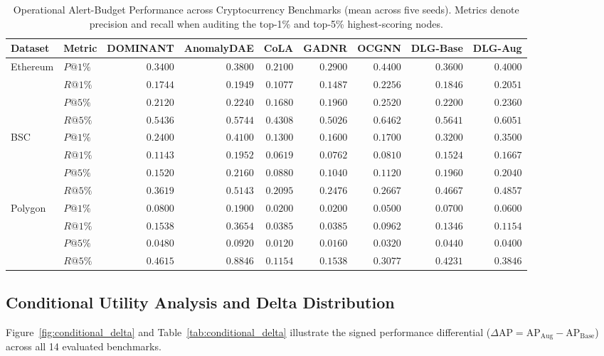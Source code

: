 \documentclass[applsci,article,submit,moreauthors,pdftex]{Definitions/mdpi}
\begin{document}
\begin{table}[htbp]
\centering\small\setlength{\tabcolsep}{3.5pt}
\caption{Operational Alert-Budget Performance across Cryptocurrency Benchmarks (mean across five seeds). Metrics denote precision and recall when auditing the top-1\% and top-5\% highest-scoring nodes.}
\label{tab:alert_budget}
\begin{tabularx}{\textwidth}{llrrrrrrr}\toprule
\textbf{Dataset} & \textbf{Metric} & \textbf{DOMINANT} & \textbf{AnomalyDAE} & \textbf{CoLA} & \textbf{GADNR} & \textbf{OCGNN} & \textbf{DLG-Base} & \textbf{DLG-Aug} \\\midrule
\multirow{4}{*}{Ethereum} 
& $P@1\%$ & $0.3400$ & $0.3800$ & $0.2100$ & $0.2900$ & $\mathbf{0.4400}$ & $0.3600$ & $0.4000$ \\
& $R@1\%$ & $0.1744$ & $0.1949$ & $0.1077$ & $0.1487$ & $\mathbf{0.2256}$ & $0.1846$ & $0.2051$ \\
& $P@5\%$ & $0.2120$ & $0.2240$ & $0.1680$ & $0.1960$ & $\mathbf{0.2520}$ & $0.2200$ & $0.2360$ \\
& $R@5\%$ & $0.5436$ & $0.5744$ & $0.4308$ & $0.5026$ & $\mathbf{0.6462}$ & $0.5641$ & $0.6051$ \\\midrule
\multirow{4}{*}{BSC} 
& $P@1\%$ & $0.2400$ & $\mathbf{0.4100}$ & $0.1300$ & $0.1600$ & $0.1700$ & $0.3200$ & $0.3500$ \\
& $R@1\%$ & $0.1143$ & $\mathbf{0.1952}$ & $0.0619$ & $0.0762$ & $0.0810$ & $0.1524$ & $0.1667$ \\
& $P@5\%$ & $0.1520$ & $\mathbf{0.2160}$ & $0.0880$ & $0.1040$ & $0.1120$ & $0.1960$ & $0.2040$ \\
& $R@5\%$ & $0.3619$ & $\mathbf{0.5143}$ & $0.2095$ & $0.2476$ & $0.2667$ & $0.4667$ & $0.4857$ \\\midrule
\multirow{4}{*}{Polygon} 
& $P@1\%$ & $0.0800$ & $\mathbf{0.1900}$ & $0.0200$ & $0.0200$ & $0.0500$ & $0.0700$ & $0.0600$ \\
& $R@1\%$ & $0.1538$ & $\mathbf{0.3654}$ & $0.0385$ & $0.0385$ & $0.0962$ & $0.1346$ & $0.1154$ \\
& $P@5\%$ & $0.0480$ & $\mathbf{0.0920}$ & $0.0120$ & $0.0160$ & $0.0320$ & $0.0440$ & $0.0400$ \\
& $R@5\%$ & $0.4615$ & $\mathbf{0.8846}$ & $0.1154$ & $0.1538$ & $0.3077$ & $0.4231$ & $0.3846$ \\\bottomrule
\end{tabularx}
\end{table}

\subsection{Conditional Utility Analysis and Delta Distribution}
Figure~\ref{fig:conditional_delta} and Table~\ref{tab:conditional_delta} illustrate the signed performance differential ($\Delta\mathrm{AP} = \mathrm{AP}_{\mathrm{Aug}} - \mathrm{AP}_{\mathrm{Base}}$) across all 14 evaluated benchmarks.
\end{document}
